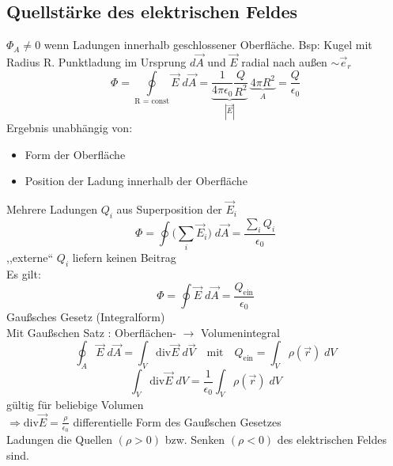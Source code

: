 \documentclass[titlepage,12pt,a4paper,ngerman]{report}
\newcommand{\tx}[1]{\textrm{#1}}
\begin{document}
\subsection{Quellstärke des elektrischen Feldes}
$\Phi_A \neq 0$ wenn Ladungen innerhalb geschlossener Oberfläche. Bsp: Kugel mit Radius R. Punktladung im Ursprung $d\vec{A}$ und $\vec{E}$ radial nach außen $\sim \vec{e}_r$ 
$$\Phi = \oint\limits_{\textrm{R = const}} \vec{E}\; d \vec{A} = \underbrace{\frac{1}{4\pi\epsilon_0} \frac{Q}{R^2}}_{|\vec{E}|}\  \underbrace{4\pi R^2}_{A} = \frac{Q}{\epsilon_0}$$
Ergebnis unabhängig von:
\begin{itemize}
\item Form der Oberfläche
\item Position der Ladung innerhalb der Oberfläche
\end{itemize} 
Mehrere Ladungen $Q_i$ aus Superposition der $\vec{E}_i$ 
$$\Phi = \oint \Big(\sum_i \vec{E}_i\Big) \;d \vec{A} = \frac{\sum_i Q_i}{\epsilon_0}$$
,,externe`` $Q_i$ liefern keinen Beitrag\\
Es gilt:
$$\boxed{\Phi = \oint \vec{E}\; d\vec{A} = \frac{Q_{\tx{ein}}}{\epsilon_0}} $$
Gaußsches Gesetz (Integralform)\\
Mit Gaußschen Satz : Oberflächen- $\rightarrow$ Volumenintegral\\
$$ \oint_A \vec{E} \;d \vec{A} = \int_V \textrm{div} \vec{E} \; d \vec{V} \quad \textrm{mit} \quad Q_{\tx{ein}} = \int_V \rho(\vec{r})\;dV$$
$$\int_V \textrm{div} \vec{E}\; dV = \frac{1}{\epsilon_0} \int_V \rho(\vec{r}) \; dV$$
gültig für beliebige Volumen\\
$\Rightarrow \textrm{div} \vec{E}=\frac{\rho}{\epsilon_0}$ differentielle Form des Gaußschen Gesetzes\\
Ladungen die Quellen $(\rho > 0 )$ bzw. Senken $(\rho < 0)$ des elektrischen Feldes sind.
\end{document}
